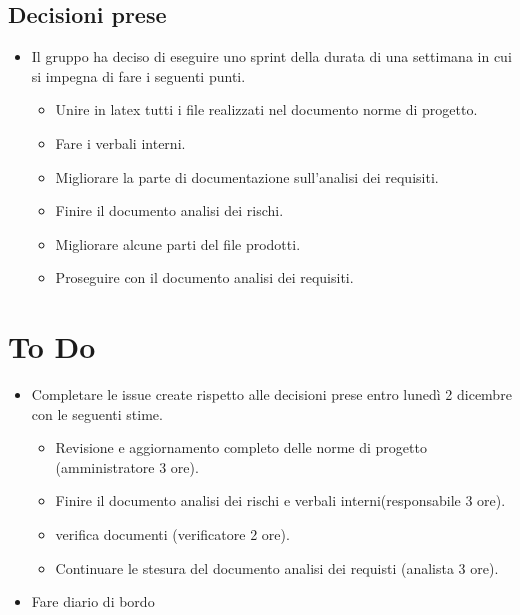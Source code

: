 \documentclass[a4paper, 12pt]{article}
\begin{document}
\subsection{Decisioni prese}
\begin{itemize}
    \item Il gruppo ha deciso di eseguire uno sprint della durata di una settimana in cui si impegna di fare i seguenti punti.
    \begin{itemize}
        \item Unire in latex tutti i file realizzati nel documento norme di progetto.
        \item Fare i verbali interni.
        \item Migliorare la parte di documentazione sull'analisi dei requisiti.
        \item Finire il documento analisi dei rischi.
        \item Migliorare alcune parti del file prodotti.
        \item Proseguire con il documento analisi dei requisiti.
    \end{itemize}
\end{itemize}

\section{To Do}
    \begin{itemize}
        \item Completare le issue create rispetto alle decisioni prese entro lunedì 2 dicembre con le seguenti stime.
        \begin{itemize}
            \item Revisione e aggiornamento completo delle norme di progetto (amministratore 3 ore).
            \item Finire il documento analisi dei rischi e verbali interni(responsabile 3 ore).
            \item verifica documenti (verificatore 2 ore).
            \item Continuare le stesura del documento analisi dei requisti (analista 3 ore).
        \end{itemize}
        \item Fare diario di bordo
    \end{itemize}
\end{document}
